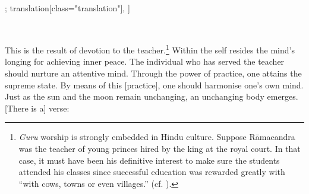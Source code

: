 \begin{alignment}[
  texts=edition[class="edition"];
  translation[class="translation"],
  ]
\begin{edition}
\begin{tlg}[44_1]
\\
\end{tlg}
  \end{edition}
  \begin{translation}
                   \begin{tlate}[p43_01]
\noindent
This is the result of devotion to the teacher.\footnote{\textit{Guru} worship is strongly embedded in Hindu culture. Suppose Rāmacandra was the teacher of young princes hired by the king at the royal court. In that case, it must have been his definitive interest to make sure the students attended his classes since successful education was rewarded greatly with ``with cows, towns or even villages.'' (cf. \citeauthor[1939:20]{manasollasa}).} Within the self resides the mind's longing for achieving inner peace. The individual who has served the teacher should nurture an attentive mind. Through the power of practice, one attains the supreme state. By means of this [practice], one should harmonise one's own mind. Just as the sun and the moon remain unchanging, an unchanging body emerges. [There is a] verse:

\end{tlate}
\end{translation}
\end{alignment}
